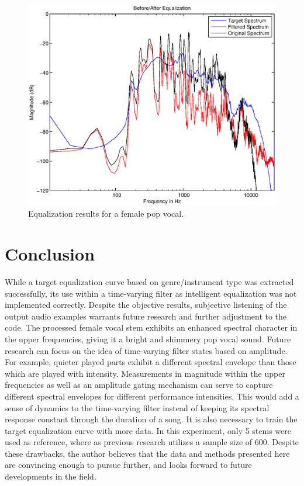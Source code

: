 \documentclass{article}
\begin{document}
\begin{figure}[htbp]
\centering
\includegraphics[width=0.9\columnwidth]{vocalresults.eps}
\caption{Equalization results for a female pop vocal.}
\label{fig:vocal}
\end{figure}


\section{Conclusion}
\label{sec:Results}

While a target equalization curve based on genre/instrument type was extracted successfully, its use within a time-varying filter as intelligent equalization was not implemented correctly.  Despite the objective results, subjective listening of the output audio examples warrants future research and further adjustment to the code.  The processed female vocal stem exhibits an enhanced spectral character in the upper frequencies, giving it a bright and shimmery pop vocal sound.  Future research can focus on the idea of time-varying filter states based on amplitude.  For example, quieter played parts exhibit a different spectral envelope than those which are played with intensity.  Measurements in magnitude within the upper frequencies as well as an amplitude gating mechanism can serve to capture different spectral envelopes for different performance intensities.  This would add a sense of dynamics to the time-varying filter instead of keeping its spectral response constant through the duration of a song.  It is also necessary to train the target equalization curve with more data.  In this experiment, only 5 stems were used as reference, where as previous research utilizes a sample size of 600.  Despite these drawbacks, the author believes that the data and methods presented here are convincing enough to pursue further, and looks forward to future developments in the field.
\end{document}
